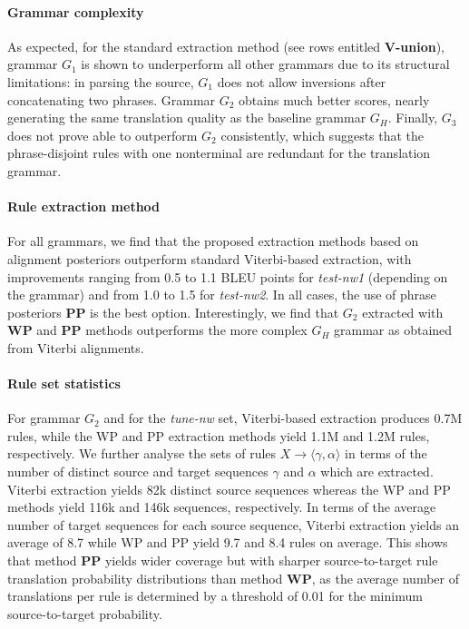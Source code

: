 
\paragraph{Grammar complexity}

As expected, for the standard extraction method (see
rows entitled {\bf V-union}), grammar $G_1$ is shown to underperform all other
grammars due to its structural limitations: in parsing the source, $G_1$
does not allow inversions after concatenating two phrases. %
Grammar $G_2$
obtains much better scores, nearly generating the same translation quality as
the baseline grammar $G_H$. Finally, $G_3$ does not prove able to outperform
$G_2$ consistently, which suggests that the phrase-disjoint rules with one nonterminal are
redundant for the translation grammar.
    
\paragraph{Rule extraction method}

For all grammars, we find that the proposed
extraction methods based on alignment posteriors outperform standard
Viterbi-based extraction, with improvements ranging from 0.5 to 1.1 BLEU points
for {\em test-nw1} (depending on the grammar) and from 1.0 to 1.5 for
{\em test-nw2}. In all cases, the use of phrase posteriors {\bf PP} is the best
option. Interestingly, we find that $G_2$ extracted with {\bf WP} and {\bf PP}
methods outperforms the more complex $G_H$ grammar as obtained from Viterbi
alignments.
    
\paragraph{Rule set statistics}

For grammar $G_2$ and for the {\em tune-nw} set,
Viterbi-based extraction produces 0.7M rules, while the WP and PP extraction
methods yield 1.1M and 1.2M rules, respectively. We further analyse the sets of
rules $X \rightarrow \langle \gamma,\alpha \rangle$ in terms of the number of
distinct source and target sequences $\gamma$ and $\alpha$ which are extracted.
Viterbi extraction yields 82k distinct source sequences whereas the WP and PP
methods yield 116k and 146k sequences, respectively. In terms of the average
number of target sequences for each source sequence, Viterbi extraction yields
an average of 8.7 while WP and PP yield 9.7 and 8.4 rules on average. This shows
that method {\bf PP} yields wider coverage but with sharper source-to-target
rule translation probability distributions than method {\bf WP}, as the average
number of translations per rule is determined by a threshold of 0.01 for
the minimum source-to-target probability. %

